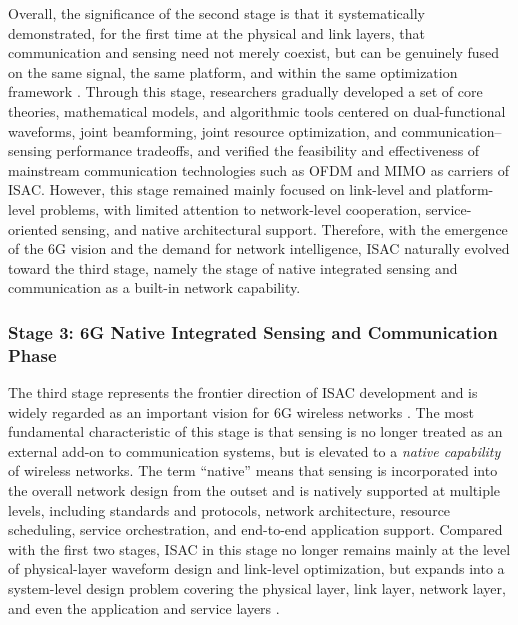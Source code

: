 Overall, the significance of the second stage is that it systematically demonstrated, for the first time at the physical and link layers, that communication and sensing need not merely coexist, but can be genuinely fused on the same signal, the same platform, and within the same optimization framework \cite{Liu2020JointRadarComm,Liu2022ISAC,Hassanien2015dual}. Through this stage, researchers gradually developed a set of core theories, mathematical models, and algorithmic tools centered on dual-functional waveforms, joint beamforming, joint resource optimization, and communication--sensing performance tradeoffs, and verified the feasibility and effectiveness of mainstream communication technologies such as OFDM and MIMO as carriers of ISAC. However, this stage remained mainly focused on link-level and platform-level problems, with limited attention to network-level cooperation, service-oriented sensing, and native architectural support. Therefore, with the emergence of the 6G vision and the demand for network intelligence, ISAC naturally evolved toward the third stage, namely the stage of native integrated sensing and communication as a built-in network capability.

\subsubsection{Stage 3: 6G Native Integrated Sensing and Communication Phase}
\label{subsubsec:ch1-stage3}

The third stage represents the frontier direction of ISAC development and is widely regarded as an important vision for 6G wireless networks \cite{Liu2022ISAC,Gonzalez2024integrated,Saad2020Vision6G}. The most fundamental characteristic of this stage is that sensing is no longer treated as an external add-on to communication systems, but is elevated to a \emph{native capability} of wireless networks. The term ``native'' means that sensing is incorporated into the overall network design from the outset and is natively supported at multiple levels, including standards and protocols, network architecture, resource scheduling, service orchestration, and end-to-end application support. Compared with the first two stages, ISAC in this stage no longer remains mainly at the level of physical-layer waveform design and link-level optimization, but expands into a system-level design problem covering the physical layer, link layer, network layer, and even the application and service layers \cite{Liu2022ISAC,Zhang2020perceptive}.

